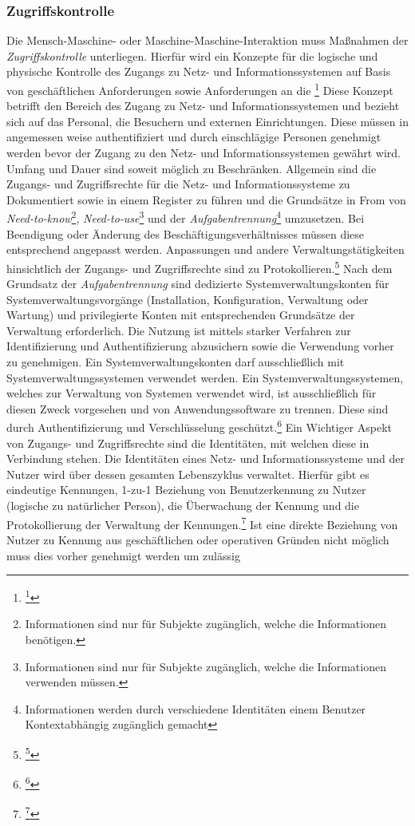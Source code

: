 \documentclass[11pt,a4paper,hidelinks]{article}   %
\begin{document}
            \subsubsection{Zugriffskontrolle}
            Die Mensch-Maschine- oder Maschine-Maschine-Interaktion muss Maßnahmen der \emph{Zugriffskontrolle} unterliegen. Hierfür wird ein Konzepte für die logische und physische Kontrolle des Zugangs zu Netz- und Informationssystemen auf Basis von geschäftlichen Anforderungen sowie Anforderungen an die \footnote{\footcite[Vgl.][, Anhang, Nummer 11.1.1.]{EU2024-2690}} Diese Konzept betrifft den Bereich des Zugang zu Netz- und Informationssystemen und bezieht sich auf das Personal, die Besuchern und externen Einrichtungen. Diese müssen in angemessen weise authentifiziert und durch einschlägige Personen genehmigt werden bevor der Zugang zu den Netz- und Informationssystemen gewährt wird. Umfang und Dauer sind soweit möglich zu Beschränken. Allgemein sind die Zugangs- und Zugriffsrechte für die Netz- und Informationssysteme zu Dokumentiert sowie in einem Register zu führen und die Grundsätze in From von \emph{Need-to-know}\footnote{Informationen sind nur für Subjekte zugänglich, welche die Informationen benötigen.}, \emph{Need-to-use}\footnote{Informationen sind nur für Subjekte zugänglich, welche die Informationen verwenden müssen.} und der \emph{Aufgabentrennung}\footnote{Informationen werden durch verschiedene Identitäten einem Benutzer Kontextabhängig zugänglich gemacht} umzusetzen. Bei Beendigung oder Änderung des Beschäftigungsverhältnisses müssen diese entsprechend angepasst werden. Anpassungen und andere Verwaltungstätigkeiten hinsichtlich der Zugangs- und Zugriffsrechte sind zu Protokollieren.\footnote{\footcite[Vgl.][, Anhang, Nummer 11.1.2., 11.2.1. \& 11.2.2.]{EU2024-2690}} Nach dem Grundsatz der \emph{Aufgabentrennung} sind dedizierte Systemverwaltungskonten für Systemverwaltungsvorgänge (Installation, Konfiguration, Verwaltung oder Wartung) und privilegierte Konten mit entsprechenden Grundsätze der Verwaltung erforderlich. Die Nutzung ist mittels starker Verfahren zur Identifizierung und Authentifizierung abzusichern sowie die Verwendung vorher zu genehmigen. Ein Systemverwaltungskonten darf ausschließlich mit Systemverwaltungssystemen verwendet werden. Ein Systemverwaltungssystemen, welches zur Verwaltung von Systemen verwendet wird, ist ausschließlich für diesen Zweck vorgesehen und von Anwendungssoftware zu trennen. Diese sind durch Authentifizierung und Verschlüsselung geschützt.\footnote{\footcite[Vgl.][, Anhang, Nummer 11.3.2., 11.4.1. \& 11.4.2.]{EU2024-2690}} Ein Wichtiger Aspekt von Zugangs- und Zugriffsrechte sind die Identitäten, mit welchen diese in Verbindung stehen. Die Identitäten eines Netz- und Informationssysteme und der Nutzer wird über dessen gesamten Lebenszyklus verwaltet. Hierfür gibt es eindeutige Kennungen, 1-zu-1 Beziehung von Benutzerkennung zu Nutzer (logische zu natürlicher Person), die Überwachung der Kennung und die Protokollierung der Verwaltung der Kennungen.\footnote{\footcite[Vgl.][, Anhang, Nummer 11.5.2.]{EU2024-2690}} Ist eine direkte Beziehung von Nutzer zu Kennung aus geschäftlichen oder operativen Gründen nicht möglich muss dies vorher genehmigt werden um zulässig 
\end{document}
